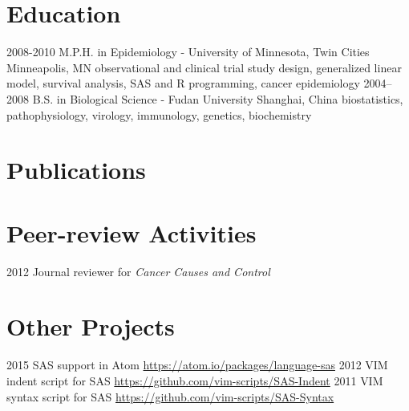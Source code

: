 \documentclass[10pt, print]{friggeri-cv}
\begin{document}
\section{Education}

\begin{entrylist}
  \entry
    {2008-2010}
    {M.P.H. in Epidemiology - University of Minnesota, Twin Cities}
    {Minneapolis, MN}
    {observational and clinical trial study design, generalized linear model, survival analysis, SAS and R programming, cancer epidemiology}
  \entry
    {2004–2008}
    {B.S. in Biological Science - Fudan University}
    {Shanghai, China}
    {biostatistics, pathophysiology, virology, immunology, genetics, biochemistry}
\end{entrylist}

\clearpage

\section{Publications}


\section{Peer-review Activities}

\begin{entrylist}
  \simpleentry
    {2012}
    {Journal reviewer for \textit{Cancer Causes and Control}}
    {}
\end{entrylist}

%

\section{Other Projects}

\begin{entrylist}
  \simpleentry
    {2015}
    {SAS support in Atom}
    {\href{https://atom.io/packages/language-sas}{https://atom.io/packages/language-sas}}
  \simpleentry
    {2012}
    {VIM indent script for SAS}
    {\href{https://github.com/vim-scripts/SAS-Indent}{https://github.com/vim-scripts/SAS-Indent}}
  \simpleentry
    {2011}
    {VIM syntax script for SAS}
    {\href{https://github.com/vim-scripts/SAS-Syntax}{https://github.com/vim-scripts/SAS-Syntax}}
\end{entrylist}
\end{document}
